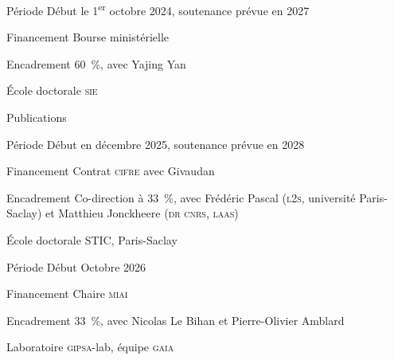 \begin{cvfields}
  \item[Période] Début le 1\textsuperscript{er} octobre 2024, soutenance
    prévue en 2027
  \item[Financement] Bourse ministérielle
  \item[Encadrement] 60~\%, avec Yajing Yan
  \item[École doctorale] \textsc{sie}
  \item[Publications] 
\end{cvfields}

\begin{cvfields}
  \item[Période] Début en décembre 2025, soutenance prévue en 2028
  \item[Financement] Contrat \textsc{cifre} avec Givaudan
  \item[Encadrement] Co-direction à 33~\%, avec Frédéric Pascal (\textsc{l2s},
    université Paris-Saclay) et Matthieu Jonckheere (\textsc{dr cnrs},
    \textsc{laas})
  \item[École doctorale] STIC, Paris-Saclay
\end{cvfields}

\begin{cvfields}
  \item[Période] Début Octobre 2026
  \item[Financement] Chaire \textsc{miai}
  \item[Encadrement] 33~\%, avec Nicolas Le Bihan et Pierre-Olivier Amblard
  \item[Laboratoire] \textsc{gipsa}-lab, équipe \textsc{gaia}
\end{cvfields}
